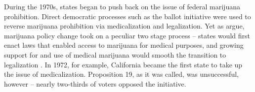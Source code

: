 
During the 1970s, states began to push back on the issue of federal marijuana prohibition. Direct democratic processes such as the ballot initiative were used to reverse marijuana prohibition via medicalization and legalization. Yet as \citet{newhart_and_dolphin_2018} argue, marijuana policy change took on a peculiar two stage process -- states would first enact laws that enabled access to marijuana for medical purposes, and growing support for and use of medical marijuana would smooth the transition to legalization \citep{kilmer_and_maccoun_2017}. In 1972, for example, California became the first state to take up the issue of medicalization. Proposition 19, as it was called, was unsuccessful, however -- nearly two-thirds of voters opposed the initiative. 

